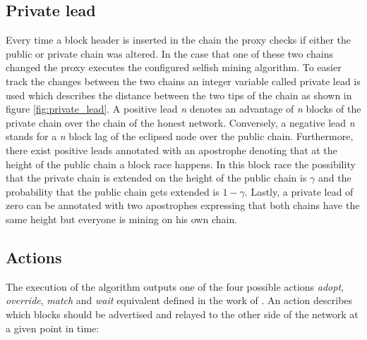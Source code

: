 \subsection{Private lead}

Every time a block header is inserted in the chain the proxy checks if either the public or private chain was altered.
In the case that one of these two chains changed the proxy executes the configured selfish mining algorithm.
To easier track the changes between the two chains an integer variable called private lead is used which describes the distance between the two tips of the chain as shown in figure \ref{fig:private_lead}.
A positive lead \textit{n} denotes an advantage of \textit{n} blocks of the private chain over the chain of the honest network.
Conversely, a negative lead \textit{n} stands for a \textit{n} block lag of the eclipsed node over the public chain.
Furthermore, there exist positive leads annotated with an apostrophe denoting that at the height of the public chain a block race happens.
In this block race the possibility that the private chain is extended on the height of the public chain is $\gamma$ and the probability that the public chain gets extended is $1 - \gamma$.
Lastly, a private lead of zero can be annotated with two apostrophes expressing that both chains have the same height but everyone is mining on his own chain.

\subsection{Actions}

The execution of the algorithm outputs one of the four possible actions \textit{adopt}, \textit{override}, \textit{match} and \textit{wait} equivalent defined in the work of \cite{sapirshtein2016optimal}.
An action describes which blocks should be advertised and relayed to the other side of the network at a given point in time:

